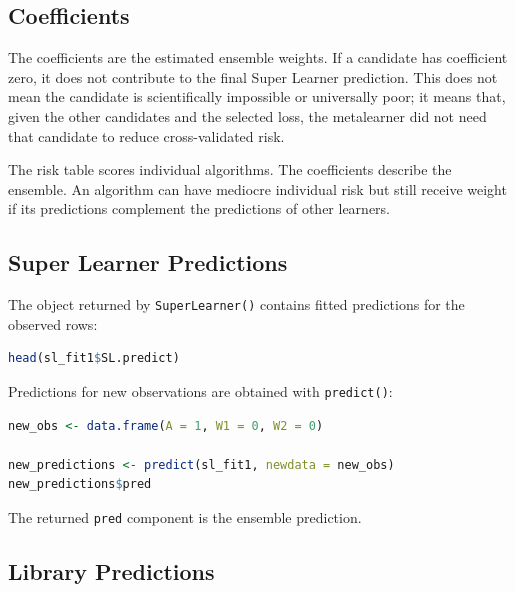 \subsection{Coefficients}

The coefficients are the estimated ensemble weights. If a candidate has coefficient
zero, it does not contribute to the final Super Learner prediction. This does not mean
the candidate is scientifically impossible or universally poor; it means that, given the
other candidates and the selected loss, the metalearner did not need that candidate to
reduce cross-validated risk.

\begin{keyidea}
The risk table scores individual algorithms. The coefficients describe the ensemble.
An algorithm can have mediocre individual risk but still receive weight if its
predictions complement the predictions of other learners.
\end{keyidea}

\subsection{Super Learner Predictions}

The object returned by \texttt{SuperLearner()} contains fitted predictions for the
observed rows:

\begin{implementationbox}
\begin{lstlisting}[language=R]
head(sl_fit1$SL.predict)
\end{lstlisting}
\end{implementationbox}

Predictions for new observations are obtained with \texttt{predict()}:

\begin{implementationbox}
\begin{lstlisting}[language=R]
new_obs <- data.frame(A = 1, W1 = 0, W2 = 0)

new_predictions <- predict(sl_fit1, newdata = new_obs)
new_predictions$pred
\end{lstlisting}
\end{implementationbox}

The returned \texttt{pred} component is the ensemble prediction.

\subsection{Library Predictions}

